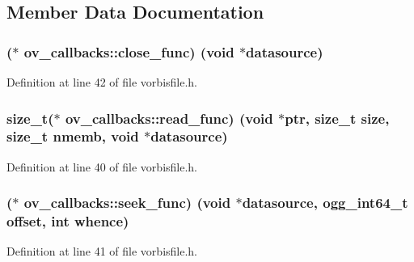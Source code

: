 \subsection{Member Data Documentation}
\subsubsection[{\texorpdfstring{close\+\_\+func}{close_func}}]{($\ast$ ov\+\_\+callbacks\+::close\+\_\+func) ({\bf void} $\ast$datasource)}\hypertarget{structov__callbacks_a4d1141e00251a23b27e1de261e8717ec}{}\label{structov__callbacks_a4d1141e00251a23b27e1de261e8717ec}


Definition at line 42 of file vorbisfile.\+h.

\subsubsection[{\texorpdfstring{read\+\_\+func}{read_func}}]{\setlength{\rightskip}{0pt plus 5cm}size\+\_\+t($\ast$ ov\+\_\+callbacks\+::read\+\_\+func) ({\bf void} $\ast$ptr, size\+\_\+t {\bf size}, size\+\_\+t {\bf nmemb}, {\bf void} $\ast$datasource)}\hypertarget{structov__callbacks_a301b93b9f0436e5bde6dbdeb0edeae77}{}\label{structov__callbacks_a301b93b9f0436e5bde6dbdeb0edeae77}


Definition at line 40 of file vorbisfile.\+h.

\subsubsection[{\texorpdfstring{seek\+\_\+func}{seek_func}}]{($\ast$ ov\+\_\+callbacks\+::seek\+\_\+func) ({\bf void} $\ast$datasource, {\bf ogg\+\_\+int64\+\_\+t} {\bf offset}, {\bf int} whence)}\hypertarget{structov__callbacks_aa49d8079756c1c26e2ba9b974e463dfa}{}\label{structov__callbacks_aa49d8079756c1c26e2ba9b974e463dfa}


Definition at line 41 of file vorbisfile.\+h.

